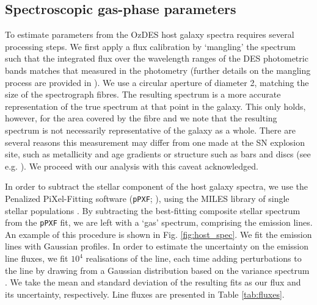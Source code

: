 \documentclass[fleqn,usenatbib,]{mnras}
\newcommand{\replychris}[1]{\color{magenta}#1 \color{black}}
\newcommand{\replylluis}[1]{\color{brown}#1 \color{black}}
\begin{document}
\subsection{Spectroscopic gas-phase parameters \label{subsec:linefit}}

To estimate parameters from the OzDES host galaxy spectra requires several processing steps. We first apply a flux calibration by `mangling' the spectrum such that the integrated flux over the wavelength ranges of the DES photometric bands matches that measured in the photometry (further details on the mangling process are provided in \citealt{Swann2020}). We use a circular aperture of diameter 2\arcsec, matching the size of the spectrograph fibres. \replylluis{The resulting spectrum is a more accurate representation of the true spectrum at that point in the galaxy. This only holds, however, for the area covered by the fibre and we note that the resulting spectrum is not necessarily representative of the galaxy as a whole. There are several reasons this measurement may differ from one made at the SN explosion site, such as metallicity and age gradients or structure such as bars and discs (see e.g. \citealt{Iglesias-Paramo2013,Iglesias-Paramo2016}). We proceed with our analysis with this caveat acknowledged.}

In order to subtract the stellar component of the host galaxy spectra, we use the Penalized PiXel-Fitting software (\texttt{pPXF}; \citealt{Cappellari2004,Cappellari2012,Cappellari2017}), using the MILES library of single stellar populations \citep{Vazdekis2010}. By subtracting the best-fitting composite stellar spectrum from the \texttt{pPXF} fit, we are left with a `gas' spectrum, comprising the emission lines. An example of this procedure is shown in Fig. \ref{fig:host_spec}. We fit the emission lines with Gaussian profiles. In order to estimate the uncertainty on the emission line fluxes, we fit $10^4$ realisations of the line, each time adding perturbations to the line by drawing from a Gaussian distribution \replychris{based on the variance spectrum}. We take the mean and standard deviation of the resulting fits as our flux and its uncertainty, respectively. Line fluxes are presented in Table \ref{tab:fluxes}.
\end{document}
